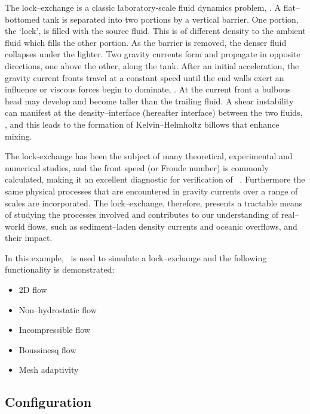 The lock--exchange is a classic laboratory-scale fluid dynamics problem, \citep{fannelop_94, huppert_06, simpson_87}. A flat--bottomed tank is separated into two portions by a vertical barrier. One portion, the `lock', is filled with the source fluid. This is of different density to the ambient fluid which fills the other portion. As the barrier is removed, the denser fluid collapses under the lighter. Two gravity currents form and propagate in opposite directions, one above the other, along the tank. After an initial acceleration, the gravity current fronts travel at a constant speed until the end walls exert an influence or viscous forces begin to dominate, \citep{cantero_07, hartel_99, huppert_80}. At the current front a bulbous head may develop and become taller than the trailing fluid. A shear instability can manifest at the density--interface (hereafter interface) between the two fluids, \citep{turner_73}, and this leads to the formation of Kelvin--Helmholtz billows that enhance mixing.

The lock-exchange has been the subject of many theoretical, experimental and numerical studies, and the front speed (or Froude number) is commonly calculated, making it an excellent diagnostic for verification of \fluidity\ \citep[e.g.]{benjamin_68, klemp_94, hartel_00}. Furthermore the same physical processes that are encountered in gravity currents over a range of scales are incorporated. The lock--exchange, therefore, presents a tractable means of studying the processes involved and contributes to our understanding of real--world flows, such as sediment--laden density currents and oceanic overflows, and their impact.

In this example, \fluidity\ is used to simulate a lock--exchange and the following functionality is demonstrated:

\begin{itemize}
\item 2D flow
\item Non--hydrostatic flow
\item Incompressible flow
\item Boussinesq flow
\item Mesh adaptivity

\end{itemize}

\subsection{Configuration}
\label{sec:lock_exchange_configuration}

